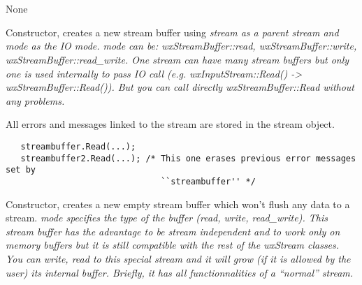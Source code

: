 \section{}\label{wxstreambuffer}


None




\label{wxstreambufconst}


Constructor, creates a new stream buffer using \it{stream} as a parent stream
and \it{mode} as the IO mode. \it{mode} can be: wxStreamBuffer::read,
wxStreamBuffer::write, wxStreamBuffer::read\_write.
One stream can have many stream buffers but only one is used internally to
pass IO call (e.g. wxInputStream::Read() -> wxStreamBuffer::Read()). But you
can call directly wxStreamBuffer::Read without any problems.


All errors and messages linked to the stream are stored in the stream object.
\begin{verbatim}
   streambuffer.Read(...);
   streambuffer2.Read(...); /* This one erases previous error messages set by 
                               ``streambuffer'' */
\end{verbatim}


Constructor, creates a new empty stream buffer which won't flush any data
to a stream. \it{mode} specifies the type of the buffer (read, write, read\_write). This stream buffer has the advantage to be stream independent and to
work only on memory buffers but it is still compatible with the rest of the
wxStream classes. You can write, read to this special stream and it will
grow (if it is allowed by the user) its internal buffer. Briefly, it has all
functionnalities of a ``normal'' stream.


